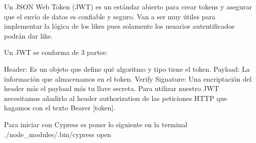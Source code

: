 Un JSON Web Token (JWT) es un estándar abierto para crear tokens y asegurar que el envío de datos es confiable y seguro.
Van a ser muy útiles para implementar la lógica de los likes pues solamente los usuarios autentificados podrán dar like.

Un JWT se conforma de 3 partes:

Header: Es un objeto que define qué algoritmo y tipo tiene el token.
Payload: La información que almacenamos en el token.
Verify Signature: Una encriptación del header más el payload más tu llave secreta.
Para utilizar nuestro JWT necesitamos añadirlo al header authorization de las peticiones HTTP que hagamos con el texto Bearer [token].

Para iniciar con Cypress es poner lo siguiente en la terminal
./node_modules/.bin/cypress open
